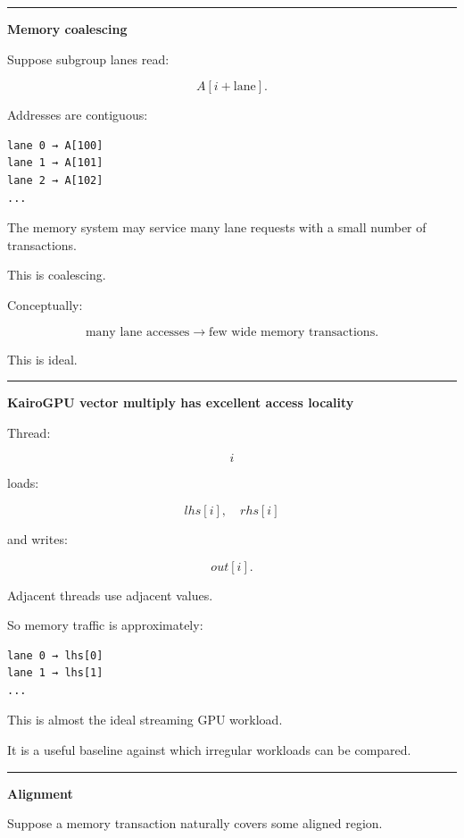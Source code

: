 \begin{center}\rule{0.5\linewidth}{0.5pt}\end{center}

\textbf{Memory coalescing}

Suppose subgroup lanes read:

\[
A[i+\text{lane}].
\]

Addresses are contiguous:

\protect{}\label{4d98r5}%
\begin{verbatim}
lane 0 → A[100]
lane 1 → A[101]
lane 2 → A[102]
...
\end{verbatim}

The memory system may service many lane requests with a small number of transactions.

This is coalescing.

Conceptually:

\[
\boxed{
\text{many lane accesses}
\rightarrow
\text{few wide memory transactions}.
}
\]

This is ideal.

\begin{center}\rule{0.5\linewidth}{0.5pt}\end{center}

\textbf{KairoGPU vector multiply has excellent access locality}

Thread:

\[
i
\]

loads:

\[
lhs[i],
\quad
rhs[i]
\]

and writes:

\[
out[i].
\]

Adjacent threads use adjacent values.

So memory traffic is approximately:

\protect{}\label{r4zgcd}%
\begin{verbatim}
lane 0 → lhs[0]
lane 1 → lhs[1]
...
\end{verbatim}

This is almost the ideal streaming GPU workload.

It is a useful baseline against which irregular workloads can be compared.

\begin{center}\rule{0.5\linewidth}{0.5pt}\end{center}

\textbf{Alignment}

Suppose a memory transaction naturally covers some aligned region.

